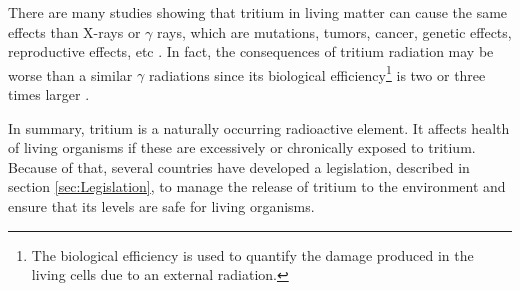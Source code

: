 There are many studies showing that tritium in living matter can cause the same effects than X-rays or $\gamma$ rays, which are mutations, tumors, cancer, genetic effects, reproductive effects, etc \cite{StraumeTritiumHazard, RytoemaaTritiumHazard}. In fact, the consequences of tritium radiation may be worse than a similar $\gamma$ radiations since its biological efficiency\footnote{The biological efficiency is used to quantify the damage produced in the living cells due to an external radiation.} is two or three times larger \cite{StraumeTritiumHazard}.

In summary, tritium is a naturally occurring radioactive element. It affects health of living organisms if these are excessively or chronically exposed to tritium. Because of that, several countries have developed a legislation, described in section \ref{sec:Legislation}, to manage the release of tritium to the environment and ensure that its levels are safe for living organisms.





